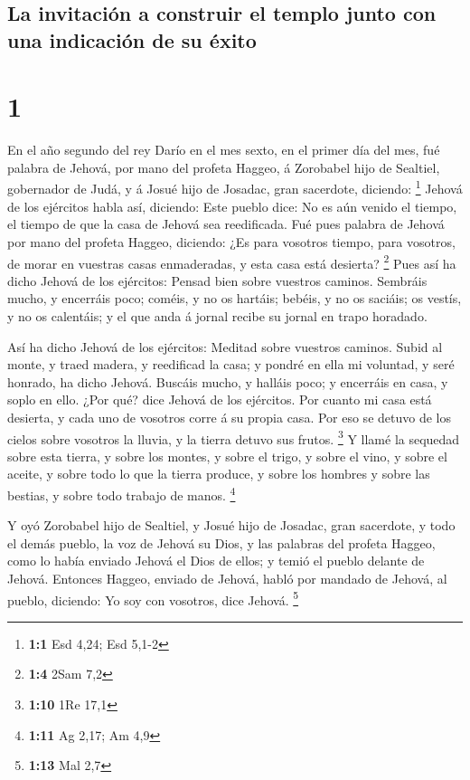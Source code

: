 \hypertarget{la-invitaciuxf3n-a-construir-el-templo-junto-con-una-indicaciuxf3n-de-su-uxe9xito}{%
\subsection{La invitación a construir el templo junto con una indicación
de su
éxito}\label{la-invitaciuxf3n-a-construir-el-templo-junto-con-una-indicaciuxf3n-de-su-uxe9xito}}

\hypertarget{section}{%
\section{1}\label{section}}

 En el año segundo del rey Darío en el mes sexto, en el
primer día del mes, fué palabra de Jehová, por mano del profeta Haggeo,
á Zorobabel hijo de Sealtiel, gobernador de Judá, y á Josué hijo de
Josadac, gran sacerdote, diciendo: \footnote{\textbf{1:1} Esd 4,24; Esd
  5,1-2}  Jehová de los ejércitos habla así, diciendo: Este
pueblo dice: No es aún venido el tiempo, el tiempo de que la casa de
Jehová sea reedificada.  Fué pues palabra de Jehová por mano
del profeta Haggeo, diciendo:  ¿Es para vosotros tiempo,
para vosotros, de morar en vuestras casas enmaderadas, y esta casa está
desierta? \footnote{\textbf{1:4} 2Sam 7,2}  Pues así ha
dicho Jehová de los ejércitos: Pensad bien sobre vuestros caminos.
 Sembráis mucho, y encerráis poco; coméis, y no os hartáis;
bebéis, y no os saciáis; os vestís, y no os calentáis; y el que anda á
jornal recibe su jornal en trapo horadado.

 Así ha dicho Jehová de los ejércitos: Meditad sobre
vuestros caminos.  Subid al monte, y traed madera, y
reedificad la casa; y pondré en ella mi voluntad, y seré honrado, ha
dicho Jehová.  Buscáis mucho, y halláis poco; y encerráis en
casa, y soplo en ello. ¿Por qué? dice Jehová de los ejércitos. Por
cuanto mi casa está desierta, y cada uno de vosotros corre á su propia
casa.  Por eso se detuvo de los cielos sobre vosotros la
lluvia, y la tierra detuvo sus frutos. \footnote{\textbf{1:10} 1Re 17,1}
 Y llamé la sequedad sobre esta tierra, y sobre los montes,
y sobre el trigo, y sobre el vino, y sobre el aceite, y sobre todo lo
que la tierra produce, y sobre los hombres y sobre las bestias, y sobre
todo trabajo de manos. \footnote{\textbf{1:11} Ag 2,17; Am 4,9}

 Y oyó Zorobabel hijo de Sealtiel, y Josué hijo de Josadac,
gran sacerdote, y todo el demás pueblo, la voz de Jehová su Dios, y las
palabras del profeta Haggeo, como lo había enviado Jehová el Dios de
ellos; y temió el pueblo delante de Jehová.  Entonces
Haggeo, enviado de Jehová, habló por mandado de Jehová, al pueblo,
diciendo: Yo soy con vosotros, dice Jehová. \footnote{\textbf{1:13} Mal
  2,7}


